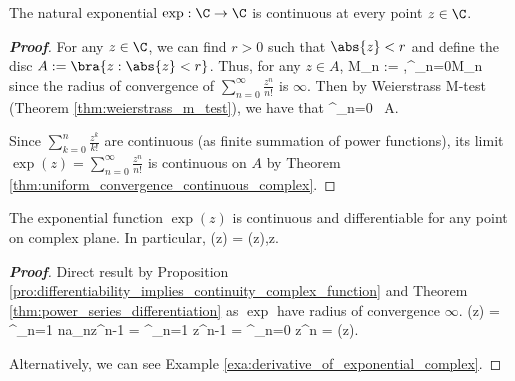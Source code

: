\begin{proposition}\label{pro:natural_exponential_complex_continuous}
The natural exponential $\exp:\C\to \C$ is continuous at every point $z\in \C$.
\end{proposition}

\begin{proof}[\bf Proof]
For any $z\in \C$, we can find $r>0$ such that $\abs{z} < r$ and define the disc $A := \bra{z:\abs{z}<r}$. Thus, for any $z\in A$,
\be
{} \leq M_n := ,\qquad \sum^\infty_{n=0}M_n \ 
\ee
since the radius of convergence of $\sum^\infty_{n=0} \frac{z^n}{n!}$ is $\infty$. Then by Weierstrass M-test (Theorem \ref{thm:weierstrass_m_test}), we have that
\be
\sum^\infty_{n=0} \ A.
\ee

Since $\sum^n_{k=0} \frac{z^k}{k!}$ are continuous (as finite summation of power functions), its limit $\exp(z) = \sum^\infty_{n=0} \frac{z^n}{n!}$ is continuous on $A$ by Theorem \ref{thm:uniform_convergence_continuous_complex}.
\end{proof}


\begin{proposition}\label{pro:derivative_natural_exponential_complex}
The exponential function $\exp(z)$ is continuous and differentiable for any point on complex plane. In particular,
\be
{}\exp(z) = \exp(z),\qquad z\in \C.
\ee
\end{proposition}

\begin{proof}[\bf Proof]
Direct result by Proposition \ref{pro:differentiability_implies_continuity_complex_function} and Theorem \ref{thm:power_series_differentiation} as $\exp$ have radius of convergence $\infty$.
\be
{}\exp(z) = \sum^\infty_{n=1} na_nz^{n-1} = \sum^\infty_{n=1}  z^{n-1} = \sum^\infty_{n=0}  z^n = \exp(z).
\ee

Alternatively, we can see Example \ref{exa:derivative_of_exponential_complex}.%
\end{proof}




